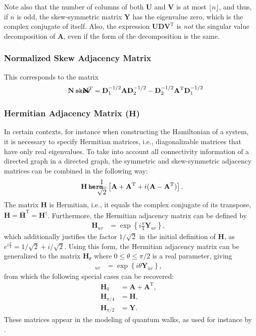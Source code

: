 \documentclass{article}
\def\mathnote#1{%
  \tag*{\rlap{\hspace\marginparsep\smash{\parbox[t]{\marginparwidth}{#1}}}}
}
\begin{document}
Note also that the number of columns of both $\mathbf U$ and $\mathbf V$
is at most $\lfloor n \rfloor$, and thus, if $n$ is odd, the
skew-symmetric matrix $\mathbf Y$ has the
eigenvalue zero, which is the complex conjugate of itself.  Also, the
expression $\mathbf U \mathbf D \mathbf V^{\mathrm T}$ is \emph{not} the
singular value decomposition of $\mathbf A$, even if the form of the
decomposition is the same. 

\subsubsection{Normalized Skew Adjacency Matrix}
This corresponds to the matrix
\begin{align}
  \mathnote{\texttt{skew}}
  \mathbf N - \mathbf N^{\mathrm T} = 
  \mathbf D_1^{-1/2} \mathbf A \mathbf D_2^{-1/2} - 
  \mathbf D_2^{-1/2} \mathbf A^{\mathrm T} \mathbf D_1^{-1/2} 
\end{align}

\subsubsection{Hermitian Adjacency Matrix ($\mathbf H$)}
In certain contexts, for instance when constructing the Hamiltonian of a
system, it is necessary to specify Hermitian matrices, i.e.,
diagonalizable matrices that have only real eigenvalues.  To take into
account all connectivity information of a directed graph in a
directed graph, the symmetric and skew-symmetric adjacency matrices can
be combined in the following way:
\begin{align}
  \mathnote{\texttt{herm}}
  \mathbf H &= \frac 1 {\sqrt 2} \left[
  \mathbf A + \mathbf A^{\mathrm T} + i(\mathbf A - \mathbf A^{\mathrm T})
  \right]. 
\end{align}
The matrix $\mathbf H$ is Hermitian, i.e., it equals the complex
conjugate of its transpose, $\mathbf H = \mathbf {\bar H}^{\mathrm T} =
\mathbf H^{\dagger}$.
Furthermore, the Hermitian adjacency matrix can be defined by
\begin{align}
  \mathbf H_{uv} &= \exp\left\{i \frac \pi 4 \mathbf Y_{uv}\right\},
\end{align}
which additionally justifies the factor $1/\sqrt 2$ in the initial
definition of $\mathbf H$, as $e^{i \frac \pi 4} = 1/\sqrt 2 + i/\sqrt
2$.  Using this form, the Hermitian adjacency matrix can be generalized
to the matrix $\mathbf H_\theta$ where $0 \leq \theta \leq \pi/2$ is a
real parameter, giving 
\begin{align}
  [\mathbf H_{\theta}]_{uv} &= \exp\left\{i \theta \mathbf Y_{uv} \right\},  
\end{align}
from which the following special cases can be recovered:
\begin{align}
  \mathbf H_0 &= \mathbf A + \mathbf A^{\mathrm T}, \\
  \mathbf H_{\pi/4} &= \mathbf H, \\
  \mathbf H_{\pi/2} &= \mathbf Y.
\end{align}
These matrices appear in the modeling of quantum walks, as used for
instance by \cite{toedtli:ctqw}.  
\end{document}
